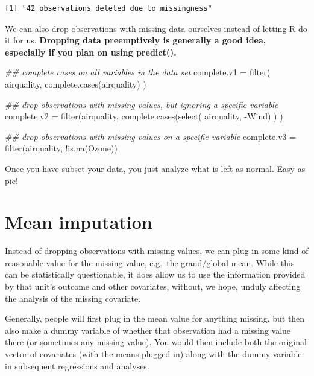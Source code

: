 \documentclass[
  letterpaper,
  DIV=11,
  numbers=noendperiod]{scrreprt}
\newenvironment{Shaded}{\begin{snugshade}}{\end{snugshade}}
\newcommand{\DocumentationTok}[1]{\textcolor[rgb]{0.73,0.13,0.13}{\textit{#1}}}
\newcommand{\FunctionTok}[1]{\textcolor[rgb]{0.02,0.16,0.49}{#1}}
\newcommand{\NormalTok}[1]{\textcolor[rgb]{0.00,0.44,0.13}{#1}}
\newcommand{\OtherTok}[1]{\textcolor[rgb]{0.00,0.44,0.13}{#1}}
\newcommand{\SpecialCharTok}[1]{\textcolor[rgb]{0.25,0.44,0.63}{#1}}
\begin{document}
\begin{verbatim}
[1] "42 observations deleted due to missingness"
\end{verbatim}

We can also drop observations with missing data ourselves instead of
letting R do it for us. \textbf{Dropping data preemptively is generally
a good idea, especially if you plan on using predict().}

\begin{Shaded}
\begin{Highlighting}[]
\DocumentationTok{\#\# complete cases on all variables in the data set }
\NormalTok{complete.v1 }\OtherTok{=} \FunctionTok{filter}\NormalTok{( airquality, }\FunctionTok{complete.cases}\NormalTok{(airquality) )}
  
\DocumentationTok{\#\# drop observations with missing values, but ignoring a specific variable  }
\NormalTok{complete.v2 }\OtherTok{=} \FunctionTok{filter}\NormalTok{(airquality, }\FunctionTok{complete.cases}\NormalTok{(}\FunctionTok{select}\NormalTok{( airquality, }\SpecialCharTok{{-}}\NormalTok{Wind) ) )}

\DocumentationTok{\#\# drop observations with missing values on a specific variable  }
\NormalTok{complete.v3 }\OtherTok{=} \FunctionTok{filter}\NormalTok{(airquality, }\SpecialCharTok{!}\FunctionTok{is.na}\NormalTok{(Ozone))}
\end{Highlighting}
\end{Shaded}

Once you have subset your data, you just analyze what is left as normal.
Easy as pie!

\hypertarget{mean-imputation}{%
\section{Mean imputation}\label{mean-imputation}}

Instead of dropping observations with missing values, we can plug in
some kind of reasonable value for the missing value, e.g.~the
grand/global mean. While this can be statistically questionable, it does
allow us to use the information provided by that unit's outcome and
other covariates, without, we hope, unduly affecting the analysis of the
missing covariate.

Generally, people will first plug in the mean value for anything
missing, but then also make a dummy variable of whether that observation
had a missing value there (or sometimes any missing value). You would
then include both the original vector of covariates (with the means
plugged in) along with the dummy variable in subsequent regressions and
analyses.
\end{document}
